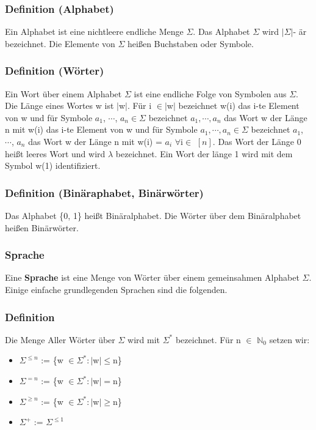 \documentclass[a4paper,11pt]{article}
\begin{document}
\subsubsection{Definition (Alphabet)}
Ein Alphabet ist eine nichtleere endliche Menge $\Sigma$. Das Alphabet $\Sigma$ wird $\lvert \Sigma \rvert$- är bezeichnet. Die Elemente von $\Sigma$ heißen Buchstaben oder Symbole.

\subsubsection{Definition (Wörter)}
Ein Wort über einem Alphabet $\Sigma$ ist eine endliche Folge von Symbolen aus $\Sigma$. Die Länge eines Wortes w ist $\lvert$w$\rvert$. Für i $\in\lvert$w$\rvert$ bezeichnet w(i) das i-te Element von w und für Symbole $a_{1}$, $\cdots$, $a_{n} \in \Sigma$ bezeichnet $a_{1}, \cdots, a_{n}$ das Wort w der Länge n mit w(i) das i-te Element von w und für Symbole $a_{1}, \cdots, a_{n} \in \Sigma$ bezeichnet $a_{1}$, $\cdots$, $a_{n}$ das Wort w der Länge n mit w(i) = $a_{i}$ $\forall$i$\in$ \([n]\). Das Wort der Länge 0 heißt leeres Wort und wird $\lambda$ bezeichnet. Ein Wort der länge 1 wird mit dem Symbol w(1) identifiziert.

\subsubsection{Definition (Binäraphabet, Binärwörter)}
Das Alphabet \{0, 1\} heißt Binäralphabet. Die Wörter über dem Binäralphabet heißen Binärwörter.

\subsubsection{Sprache}
Eine \textbf{Sprache} ist eine Menge von Wörter über einem gemeinsahmen Alphabet $\Sigma$. Einige einfache grundlegenden Sprachen sind die folgenden.

\subsubsection{Definition}
Die Menge Aller Wörter über $\Sigma$ wird mit $\Sigma^{*}$ bezeichnet. Für n $\in$ $\mathbb{N}_{0}$ setzen wir:
\begin{itemize}
    \item[] $\Sigma^{\leq n}$ := \{w $\in \Sigma^{*} : \lvert$w$\rvert \leq $n\}
    \item[] $\Sigma^{=n}$ := \{w $\in \Sigma^{*} : \lvert$w$\rvert = $n\}
    \item[] $\Sigma^{\geq n}$ := \{w $\in \Sigma^{*} : \lvert$w$\rvert \geq $n\}
    \item[] $\Sigma^{+}$ := $\Sigma^{\leq 1}$
\end{itemize}
\end{document}
